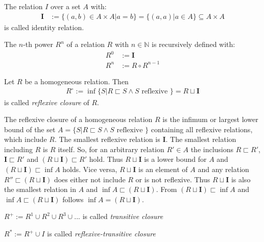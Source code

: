 \begin{definition}
The relation $I$ over a set $A$ with:
\begin{align}
\mathbf{I} &:= \{ (a,b) \in A \times A | a = b \} = \{ (a,a) | a \in A \} \subseteq A \times A
\end{align}
is called identity relation.
\end{definition}

\begin{definition}
The $n$-th power $R^n$ of a relation $R$ with $n \in \mathbb{N}$ is  recursively defined with:
\begin{align}
R^{0} &:= \mathbf{I}
\\R^{n} &:= R \circ R^{n-1}
\end{align}
\end{definition}


\begin{definition}
Let $R$ be a homogeneous relation.
Then
\begin{align}
R^\circ
:= \inf \{ S | R \sqsubset S \wedge S \text{ reflexive } \}
= R \sqcup \mathbf{I}
\end{align}
is called \emph{reflexive closure} of $R$.
\end{definition}

The reflexive closure of a homogeneous relation $R$ is the infimum or largest lower bound of the set $A = \{ S | R \sqsubset S \wedge S \text{ reflexive } \}$ containing all reflexive relations, which include $R$.
The smallest reflexive relation is $\mathbf{I}$.
The smallest relation including $R$ is $R$ itself.
So, for an arbitrary relation $R' \in A$ the inclusions $R \sqsubset R'$, $\mathbf{I} \sqsubset R'$ and $(R \sqcup \mathbf{I}) \sqsubset R'$ hold.
Thus $R \sqcup \mathbf{I}$ is a lower bound for $A$ and $(R \sqcup \mathbf{I}) \sqsubset \inf A$ holds.
Vice versa, $R \sqcup \mathbf{I}$ is an element of $A$ and any relation $R'' \sqsubset (R \sqcup \mathbf{I})$ does either not include $R$ or is not reflexive.
Thus $R \sqcup \mathbf{I}$ is also the smallest relation in $A$ and $\inf A \sqsubset (R \sqcup \mathbf{I})$.
From $(R \sqcup \mathbf{I}) \sqsubset \inf A$ and $\inf A \sqsubset (R \sqcup \mathbf{I})$ follows $\inf A = (R \sqcup \mathbf{I})$.


\begin{definition}
$R^{+} := R^{1} \cup R^{2} \cup R^{3} \cup ...$
is called \textit{transitive closure}
\end{definition}

\begin{definition}
$R^{*} := R^{+} \cup I$
is called \textit{reflexive-transitive closure}
\end{definition}
